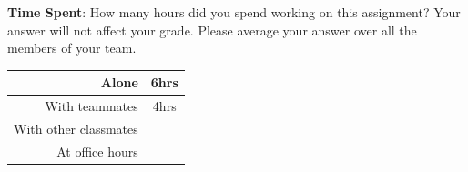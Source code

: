 \documentclass[12pt]{article}
\begin{document}
\noindent\textbf{Time Spent}: How many hours did you spend working on this assignment? Your answer will not affect your grade. Please average your answer over all the members of your team.
\begin{solution}[height=4cm]
\begin{table}[H]
    \centering
    \begin{tabular}{r|c}
        Alone &  \hspace{3em} 6hrs
        \\ \hline
        With teammates & \hspace{3em} 4hrs
        \\ \hline
        With other classmates & \hspace{3em} 
        \\ \hline
        At office hours & \hspace{3em}
        \\ \hline
    \end{tabular}
\end{table}
\end{solution}
\end{document}
